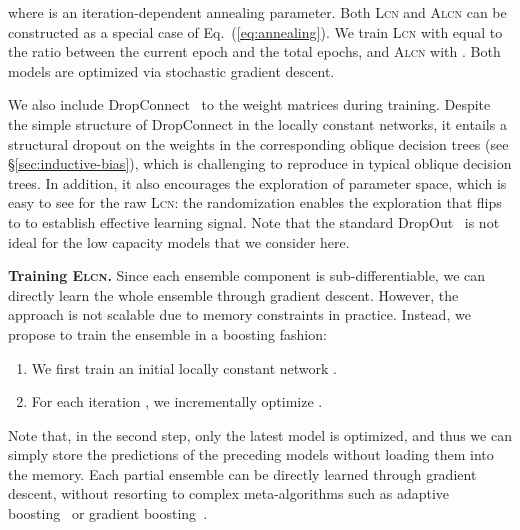 \documentclass{article} \usepackage{iclr2020_conference,times}
\newcommand{\xref}[1]{\S\ref{#1}}
\begin{document}
where  is an iteration-dependent annealing parameter. Both \textsc{Lcn} and \textsc{Alcn} can be constructed as a special case of Eq.~(\ref{eq:annealing}). We train \textsc{Lcn} with  equal to the ratio between the current epoch and the total epochs, and \textsc{Alcn} with . Both models are optimized via stochastic gradient descent. 

We also include DropConnect~\citep{wan2013regularization} to the weight matrices  during training. Despite the simple structure of DropConnect in the locally constant networks, it entails a structural dropout on the weights in the corresponding oblique decision trees (see \xref{sec:inductive-bias}), which is challenging to reproduce in typical oblique decision trees. In addition, it also encourages the exploration of parameter space, which is easy to see for the raw \textsc{Lcn}: the randomization enables the exploration that flips  to  to establish effective learning signal. Note that the standard DropOut~\citep{srivastava2014dropout} is not ideal for the low capacity models that we consider here. 

\textbf{Training \textsc{Elcn}.} Since each ensemble component is sub-differentiable, we can directly learn the whole ensemble through gradient descent. However, the approach is not scalable due to memory constraints in practice. Instead, we propose to train the ensemble in a boosting fashion:
\begin{enumerate}
\vspace{-3mm}
    \item We first train an initial locally constant network .
\vspace{-2mm}
    \item For each iteration , we incrementally optimize .
\vspace{-3mm}
\end{enumerate}
Note that, in the second step, only the latest model is optimized, and thus we can simply store the predictions of the preceding models without loading them into the memory. Each partial ensemble can be directly learned through gradient descent, without resorting to complex meta-algorithms such as adaptive boosting~\citep{freund1997decision} or gradient boosting~\citep{friedman2001greedy}.  \vspace{-1mm}
\end{document}
